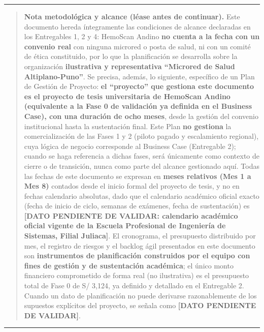\documentclass[11pt,a4paper]{article}
\begin{document}
\begin{center}\rule{0.5\linewidth}{0.5pt}\end{center}

\begin{quote}
\textbf{Nota metodológica y alcance (léase antes de continuar).} Este documento hereda íntegramente las condiciones de alcance declaradas en los Entregables 1, 2 y 4: HemoScan Andino \textbf{no cuenta a la fecha con un convenio real} con ninguna microred o posta de salud, ni con un comité de ética constituido, por lo que la planificación se desarrolla sobre la organización \textbf{ilustrativa y representativa ``Microred de Salud Altiplano-Puno''}. Se precisa, además, lo siguiente, específico de un Plan de Gestión de Proyecto: \textbf{el ``proyecto'' que gestiona este documento es el proyecto de tesis universitaria de HemoScan Andino (equivalente a la Fase 0 de validación ya definida en el Business Case), con una duración de ocho meses}, desde la gestión del convenio institucional hasta la sustentación final. Este Plan \textbf{no gestiona} la comercialización de las Fases 1 y 2 (piloto pagado y escalamiento regional), cuya lógica de negocio corresponde al Business Case (Entregable 2); cuando se haga referencia a dichas fases, será únicamente como contexto de cierre o de transición, nunca como parte del alcance gestionado aquí. Todas las fechas de este documento se expresan en \textbf{meses relativos (Mes 1 a Mes 8)} contados desde el inicio formal del proyecto de tesis, y no en fechas calendario absolutas, dado que el calendario académico oficial exacto (fecha de inicio de ciclo, semanas de exámenes, fecha de sustentación) es \textbf{{[}DATO PENDIENTE DE VALIDAR: calendario académico oficial vigente de la Escuela Profesional de Ingeniería de Sistemas, Filial Juliaca{]}}. El cronograma, el presupuesto distribuido por mes, el registro de riesgos y el backlog ágil presentados en este documento son \textbf{instrumentos de planificación construidos por el equipo con fines de gestión y de sustentación académica}; el único monto financiero comprometido de forma real (no ilustrativa) es el presupuesto total de Fase 0 de S/ 3,124, ya definido y detallado en el Entregable 2. Cuando un dato de planificación no puede derivarse razonablemente de los supuestos explícitos del proyecto, se señala como \textbf{{[}DATO PENDIENTE DE VALIDAR{]}}.
\end{quote}

\begin{center}\rule{0.5\linewidth}{0.5pt}\end{center}
\end{document}
